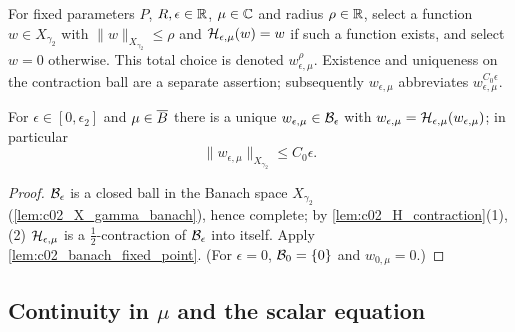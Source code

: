 \begin{definition}
  \label{def:c02_fixed_point_selection}
  For fixed parameters $P$, $R,\epsilon\in\mathbb{R}$, $\mu\in\mathbb{C}$ and radius $\rho\in\mathbb{R}$, select a function
  $w\in X_{\gamma_2}$ with $\|w\|_{X_{\gamma_2}}\le\rho$ and
  $\mathcal{H}_{\epsilon,\mu}(w)=w$ if such a function exists, and select $w=0$ otherwise.
  This total choice is denoted $w_{\epsilon,\mu}^{\rho}$.
  Existence and uniqueness on the contraction ball are a separate assertion; subsequently
  $w_{\epsilon,\mu}$ abbreviates $w_{\epsilon,\mu}^{C_0\epsilon}$.
\end{definition}

\begin{lemma}
  \label{lem:c02_w_exists}
  For $\epsilon\in[0,\epsilon_2]$ and $\mu\in\overline{B}$ there is a unique $w_{\epsilon,\mu}\in\mathcal{B}_\epsilon$ with
  $w_{\epsilon,\mu}=\mathcal{H}_{\epsilon,\mu}(w_{\epsilon,\mu})$; in particular
  \begin{equation}\label{eqn:fixed_point_solution_bound}
    \|w_{\epsilon,\mu}\|_{X_{\gamma_2}}\le C_0\epsilon .
  \end{equation}
\end{lemma}
\begin{proof}
  $\mathcal{B}_\epsilon$ is a closed ball in the Banach space $X_{\gamma_2}$ (\cref{lem:c02_X_gamma_banach}), hence complete; by
  \cref{lem:c02_H_contraction}(1),(2) $\mathcal{H}_{\epsilon,\mu}$ is a $\frac12$-contraction of $\mathcal{B}_\epsilon$ into itself. Apply
  \cref{lem:c02_banach_fixed_point}. (For $\epsilon=0$, $\mathcal{B}_0=\{0\}$ and $w_{0,\mu}=0$.)
\end{proof}

\subsection{Continuity in $\mu$ and the scalar equation}

